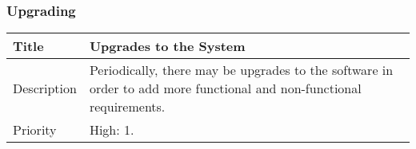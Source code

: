 \subsubsection{Upgrading}
  \begin{table}[h!]
    \label{system-constraints/deployment/upgrade-table}
    \begin{tabularx}{\textwidth}{|l|X|}
      \hline
      Title       & Upgrades to the System \\ \hline
      Description & Periodically, there may be upgrades to the software in
		order to add more functional and non-functional requirements. \\ \hline
      Priority    &   High: 1. \\ \hline
    \end{tabularx}
  \end{table}
